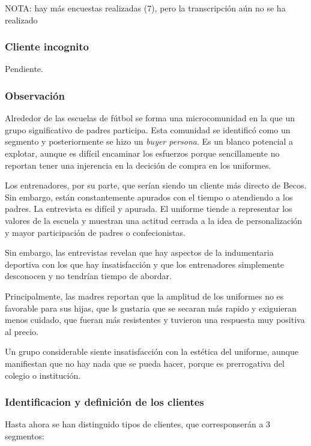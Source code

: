 \documentclass[11pt]{article}
\begin{document}
NOTA: hay más encuestas realizadas (7), pero
la transcripción aún no se ha realizado
\subsubsection{Cliente incognito}
\label{sec:org3d2d919}

Pendiente.

\subsubsection{Observación}
\label{sec:org409d903}

Alrededor de las escuelas de fútbol se forma una microcomunidad en la que un
grupo significativo de padres participa. Esta comunidad se identificó como
un segmento y posteriormente se hizo un \emph{buyer persona}. Es un blanco
potencial a explotar, aunque es difícil encaminar los esfuerzos porque
sencillamente no reportan tener una injerencia en la decición de compra en
los uniformes.

Los entrenadores, por su parte, que serían siendo un cliente más directo de
Becos. Sin embargo, están constantemente apurados con el tiempo o atendiendo
a los padres. La entrevista es difícil y apurada. El uniforme tiende a
representar los valores de la escuela y muestran una actitud cerrada a la
idea de personalización y mayor participación de padres o confecionistas.


Sin embargo, las entrevistas revelan que hay aspectos de la indumentaria
deportiva con los que hay insatisfacción y que los entrenadores simplemente
desconocen y no tendrían tiempo de abordar.

Principalmente, las madres reportan que la amplitud de los uniformes no es
favorable para sus hijas, que ls gustaria que se secaran más rapido y
exiguieran menos cuidado, que fueran más resistentes y tuvieron una
respuesta muy positiva al precio.

Un grupo considerable siente insatisfacción con la estética del uniforme,
aunque manifiestan que no hay nada que se pueda hacer, porque es
prerrogativa del colegio o institución.




\subsubsection{Identificacion y definición de los clientes}
\label{sec:org1d5c8de}

Hasta ahora se han distinguido tipos de clientes,
que corresponserán a 3 segmentos:
\end{document}
